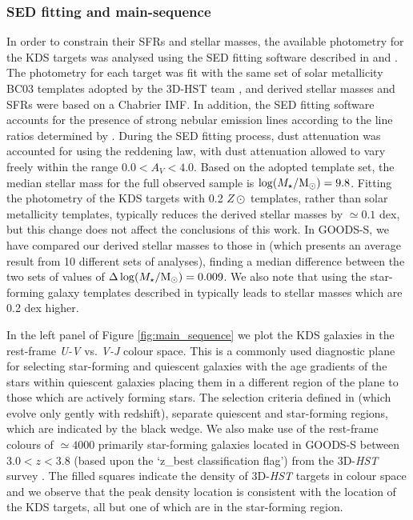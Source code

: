 \documentclass[fleqn,usenatbib]{mnras}
\begin{document}
\subsubsection{SED fitting and main-sequence}\label{subsubsec:sed_fitting}
In order to constrain their SFRs and stellar masses, the available photometry for the KDS targets was analysed using the SED fitting software described in \cite{McLure2011} and \cite{McLeod2015}.
The photometry for each target was fit with the same set of solar metallicity BC03 \citep{Bruzual2003} templates adopted by the 3D-HST team \cite{Momcheva2016}, and derived stellar masses and SFRs were based on a Chabrier IMF.
In addition, the SED fitting software accounts for the presence of strong nebular emission lines according to the line ratios determined by \cite{Cullen2014}.
During the SED fitting process, dust attenuation was accounted for using the \cite{Calzetti2000} reddening law, with dust attenuation allowed to vary freely within the range $0.0<A_{V}<4.0$.
Based on the adopted template set, the median stellar mass for the full observed sample is $\log(M_{\star}/{\rm M}_{\odot}) = 9.8$. 
Fitting the photometry of the KDS targets with 0.2 $Z\odot$ templates, rather than solar metallicity templates, typically reduces the derived stellar masses by $\simeq0.1$ dex, but this change does not affect the conclusions of this work.
In GOODS-S, we have compared our derived stellar masses to those in \cite{Santini2015} (which presents an average result from 10 different sets of analyses), finding a median difference between the two sets of values of $\Delta \log(M_{\star}/{\rm M}_{\odot}) = 0.009$.
We also note that using the star-forming galaxy templates described in \cite{Wuyts2011} typically leads to stellar masses which are 0.2 dex higher. 

In the left panel of Figure \ref{fig:main_sequence} we plot the KDS galaxies in the rest-frame {\it U-V} vs. {\it V-J} colour space.
This is a commonly used diagnostic plane for selecting star-forming and quiescent galaxies \citep[e.g.][]{Williams2009,Brammer2011,Whitaker2012a} with the age gradients of the stars within quiescent galaxies placing them in a different region of the plane to those which are actively forming stars.
The selection criteria defined in \cite{Whitaker2012a} (which evolve only gently with redshift), separate quiescent and star-forming regions, which are indicated by the black wedge.
We also make use of the rest-frame colours of $\simeq4000$ primarily star-forming galaxies located in GOODS-S between $3.0 < z < 3.8$ (based upon the `z\_best classification flag') from the 3D-{\em HST} survey \citep{Brammer2012,Momcheva2016}.
The filled squares indicate the density of 3D-{\em HST} targets in colour space and we observe that the peak density location is consistent with the location of the KDS targets, all but one of which are in the star-forming region. 
\end{document}
